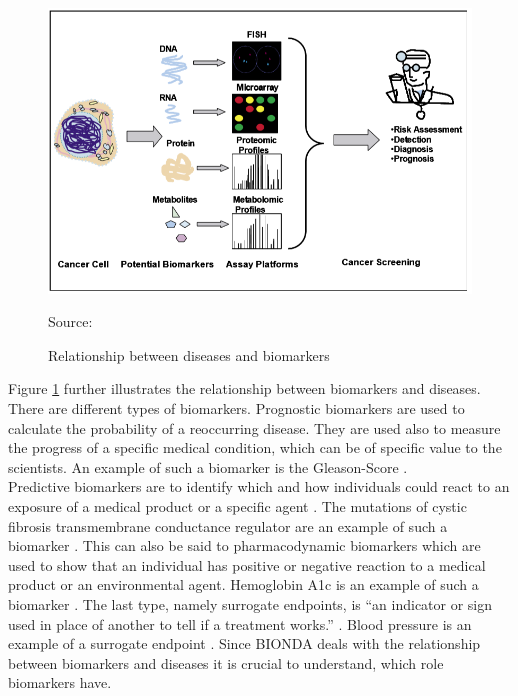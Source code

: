 \begin{figure}[H]
\centering
\includegraphics[scale=0.7]{bilder/Biomarker.PNG}
\caption{Relationship between diseases and biomarkers}
Source: \citep{maruvada_biomarkers_2005}
\label{fig:disease_biomarker}
\end{figure}

Figure \ref{fig:disease_biomarker} further illustrates the relationship between biomarkers and diseases. There are different types of biomarkers. Prognostic biomarkers are used to calculate the probability of a reoccurring disease. They are used also to measure the progress of a specific medical condition, which can be of specific value to the scientists. An example of such a biomarker is the Gleason-Score \citep{group_prognostic_2016}. \\

Predictive biomarkers are to identify which and how individuals could react to an exposure of a medical product or a specific agent \citep{group_predictive_2016}. The mutations of cystic fibrosis transmembrane conductance regulator are an example of such a biomarker \citep{group_predictive_2016}. This can also be said to pharmacodynamic biomarkers which are used to show that an individual has positive or negative reaction to a medical product or an environmental agent. Hemoglobin A1c is an example of such a biomarker  \citep{group_pharmacodynamicresponse_2016}. The last type, namely surrogate endpoints, is \enquote{an indicator or sign used in place of another to tell if a treatment works.} \citep{noauthor_nci_2011}. Blood pressure is an example of a surrogate endpoint \citep{noauthor_surrogate_nodate}. Since BIONDA deals with the relationship between biomarkers and diseases it is crucial to understand, which role biomarkers have. \\

